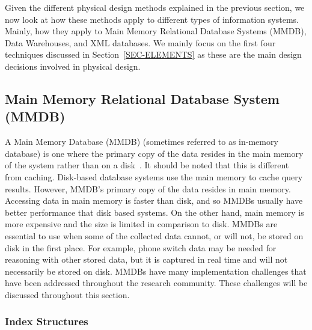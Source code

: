 \documentclass[12pt,a4paper]{article}
\begin{document}
Given the different physical design methods explained in the previous section, we now look at how these methods apply to different types of information systems.
Mainly, how they apply to Main Memory Relational Database Systems (MMDB), Data Warehouses, and XML databases. We mainly focus
on the first four techniques discussed in Section~\ref{SEC-ELEMENTS} as these are the main design decisions involved in physical design.

\subsection{Main Memory Relational Database System (MMDB)}
\label{SEC-MMDB}

A Main Memory Database (MMDB) (sometimes referred to as in-memory database) is one where the primary copy of the data resides in the main memory of the system
rather than on a disk~\cite{garcia1992main}. It should be noted that this is different from caching. Disk-based database systems use the main memory to cache
query results. However, MMDB's primary copy of the data resides in main memory. Accessing data in main memory is faster than disk, and so MMDBs usually have
better performance that disk based systems. On the other hand, main memory is more expensive and the size is limited in comparison to disk. MMDBs are
essential to use when some of the collected data cannot, or will not, be stored on disk in the first place. For example, phone switch data may be needed for
reasoning with other stored data, but it is captured in real time and will not necessarily be stored on disk. MMDBs have many implementation challenges that
have been addressed throughout the research community. These challenges will be discussed throughout this section. 

\subsubsection{Index Structures}
\end{document}
